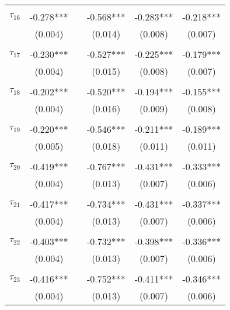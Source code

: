 \begin{tabular}{@{\extracolsep{-0pt}}lccccc}
                &           &&           &           &           \\[-2.1ex]
$\tau_{16}$     & -0.278*** && -0.568*** & -0.283*** & -0.218*** \\
                &  (0.004)  &&  (0.014)  &  (0.008)  &  (0.007)  \\
                &           &&           &           &           \\[-2.1ex]
$\tau_{17}$     & -0.230*** && -0.527*** & -0.225*** & -0.179*** \\
                &  (0.004)  &&  (0.015)  &  (0.008)  &  (0.007)  \\
                &           &&           &           &           \\[-2.1ex]
$\tau_{18}$     & -0.202*** && -0.520*** & -0.194*** & -0.155*** \\
                &  (0.004)  &&  (0.016)  &  (0.009)  &  (0.008)  \\
                &           &&           &           &           \\[-2.1ex]
$\tau_{19}$     & -0.220*** && -0.546*** & -0.211*** & -0.189*** \\
                &  (0.005)  &&  (0.018)  &  (0.011)  &  (0.011)  \\
                &           &&           &           &           \\[-2.1ex]
$\tau_{20}$     & -0.419*** && -0.767*** & -0.431*** & -0.333*** \\
                &  (0.004)  &&  (0.013)  &  (0.007)  &  (0.006)  \\
                &           &&           &           &           \\[-2.1ex]
$\tau_{21}$     & -0.417*** && -0.734*** & -0.431*** & -0.337*** \\
                &  (0.004)  &&  (0.013)  &  (0.007)  &  (0.006)  \\
                &           &&           &           &           \\[-2.1ex]
$\tau_{22}$     & -0.403*** && -0.732*** & -0.398*** & -0.336*** \\
                &  (0.004)  &&  (0.013)  &  (0.007)  &  (0.006)  \\
                &           &&           &           &           \\[-2.1ex]
$\tau_{23}$     & -0.416*** && -0.752*** & -0.411*** & -0.346*** \\
                &  (0.004)  &&  (0.013)  &  (0.007)  &  (0.006)  \\

\end{tabular}
